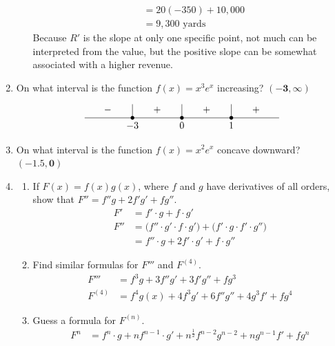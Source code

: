 \documentclass{article}
\begin{document}
\begin{enumerate}
\begin{enumerate}
$$\begin{align}
						&= 20(-350)+10,000 \\
						&= 9,300 \text{ yards}
				\end{align}$$
				Because $R'$ is the slope at only one specific point, not much can be interpreted from the value, but the positive slope can be somewhat associated with a higher revenue.
		\end{enumerate}
	\item On what interval is the function $f(x)=x^3e^x$ increasing? $\boldsymbol{(-3,\infty)}$
	\def\crulefill{\leaders\hrule
  height \dimexpr\fontdimen22\textfont2+0.2pt\relax
  depth -\dimexpr\fontdimen22\textfont2-0.2pt\relax
  \hfill
}
\def\hollow{$\kern-.8pt\circ\kern-.8pt$}
\def\filled{$\kern-.8pt\bullet\kern-.8pt$}

$$
\vbox{\offinterlineskip\tabskip=0pt
  \halign{%
    \strut$#$\hfil&
    \hfil\qquad$#$\qquad\hfil&
    \hfil\vrule#\hfil&
    \hfil\qquad$#$\qquad\hfil&
    \hfil\vrule#\hfil&
    \hfil\qquad$#$\qquad\hfil&
    \hfil\vrule#\hfil&
    \hfil\qquad$#$\qquad\hfil\cr
  & - && + && + && + \cr
  \multispan{2}\crulefill
  &\omit\hfil\filled\hfil
  &\omit\crulefill
  &\omit\hfil\filled\hfil
  &\omit\crulefill
  &\omit\hfil\filled\hfil
  &\omit\crulefill\cr
  & &\omit\hidewidth$-3$\hidewidth& &\omit\hidewidth$0$\hidewidth& &\omit\hidewidth$1$\hidewidth& \cr
}}
$$
	\item On what interval is the function $f(x)=x^2e^x$ concave downward? $\boldsymbol{(-1.5,0)}$
\setcounter{enumi}{57}
	\item 
		\begin{enumerate}
			\item If $F(x)=f(x)g(x)$, where $f$ and $g$ have derivatives of all orders, show that $F''=f''g+2f'g'+fg''$.
				$$\begin{align}
					F' &= f'\cdot g +f \cdot g' \\
					F'' &= \big(f''\cdot g'\cdot f\cdot g'\big)+\big(f'\cdot g\cdot f'\cdot g''\big)\\
					    &= f''\cdot g + 2f'\cdot g' + f\cdot g''
				\end{align}$$
			\item Find similar formulas for $F'''$ and $F^{(4)}$.
				$$\begin{align}
					F''' &=  f^{3} g + 3 f'' g' + 3 f' g'' + f g^3 \\
					F^{(4)} & = f^4 g(x) + 4 f^3 g' + 6 f'' g'' + 4 g^3 f' + f g^4
				\end{align}$$
			\item Guess a formula for $F^{(n)}$.
			$$\begin{align}
				F^{n} &= f^n\cdot g + nf^{n-1}\cdot g' + n^{\frac{1}{2}}f^{n-2}g^{n-2}+ng^{n-1}f'+fg^n
			\end{align}$$
		\end{enumerate}
\end{enumerate}
\end{document}

